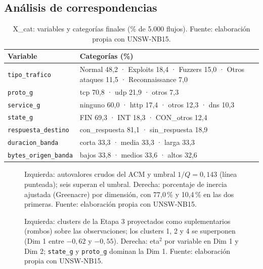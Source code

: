 \subsection{Análisis de correspondencias}

\begin{table}[htbp]
  \centering
  \caption[Variables y categorías de X\_cat]{X\_cat: variables y categorías finales (\% de 5.000 flujos). Fuente: elaboración propia con UNSW-NB15.}\label{tab:xcat}
  \begin{tablacompacta}
  \begin{tabularx}{\linewidth}{@{}lX@{}}
    \toprule
    Variable & Categorías (\%) \\
    \midrule
    \texttt{tipo\_trafico} & Normal 48,2 · Exploits 18,4 · Fuzzers 15,0 · Otros ataques 11,5 · Reconnaissance 7,0 \\
    \texttt{proto\_g} & tcp 70,8 · udp 21,9 · otros 7,3 \\
    \texttt{service\_g} & ninguno 60,0 · http 17,4 · otros 12,3 · dns 10,3 \\
    \texttt{state\_g} & FIN 69,3 · INT 18,3 · CON\_otros 12,4 \\
    \texttt{respuesta\_destino} & con\_respuesta 81,1 · sin\_respuesta 18,9 \\
    \texttt{duracion\_banda} & corta 33,3 · media 33,3 · larga 33,3 \\
    \texttt{bytes\_origen\_banda} & bajos 33,8 · medios 33,6 · altos 32,6 \\
    \bottomrule
  \end{tabularx}
  \end{tablacompacta}
\end{table}


\begin{figure}[htbp]
  \centering
  \caption[Inercia del ACM: autovalores y porcentaje ajustado]{Izquierda: autovalores crudos del ACM y umbral $1/Q = 0{,}143$ (línea punteada); seis superan el umbral. Derecha: porcentaje de inercia ajustada (Greenacre) por dimensión, con 77,0\,\% y 10,4\,\% en las dos primeras. Fuente: elaboración propia con UNSW-NB15.}
  \label{fig:a-acm-inercia}
\end{figure}

\begin{figure}[htbp]
  \centering
  \caption[Clusters suplementarios y eta$^2$ del ACM]{Izquierda: clusters de la Etapa 3 proyectados como suplementarios (rombos) sobre las observaciones; los clusters 1, 2 y 4 se superponen (Dim 1 entre $-0{,}62$ y $-0{,}55$). Derecha: eta$^2$ por variable en Dim 1 y Dim 2; \texttt{state\_g} y \texttt{proto\_g} dominan la Dim 1. Fuente: elaboración propia con UNSW-NB15.}
  \label{fig:a-acm-clusters}
\end{figure}

